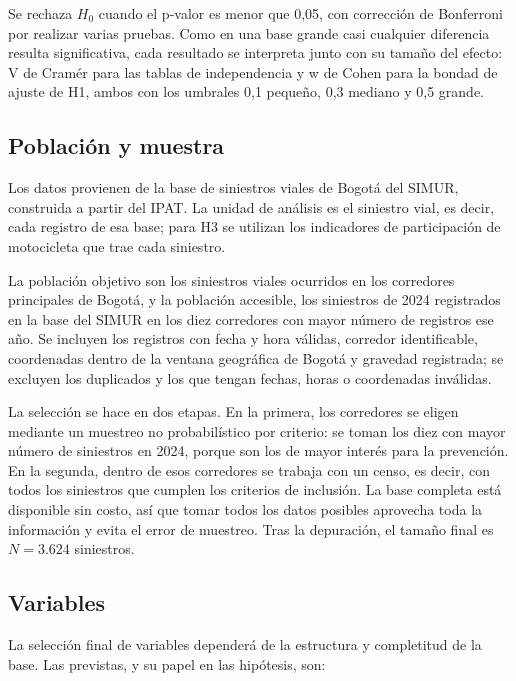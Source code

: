 \documentclass[12pt,letterpaper]{article}
\begin{document}
Se rechaza $H_0$ cuando el p-valor es menor que 0,05, con corrección de
Bonferroni por realizar varias pruebas. Como en una base grande casi
cualquier diferencia resulta significativa, cada resultado se interpreta
junto con su tamaño del efecto: V de Cramér para las tablas de
independencia y w de Cohen para la bondad de ajuste de H1, ambos con
los umbrales 0,1 pequeño, 0,3 mediano y 0,5 grande.

\hypertarget{poblaciuxf3n-y-muestra}{%
\subsection{Población y muestra}\label{poblaciuxf3n-y-muestra}}

Los datos provienen de la base de siniestros viales de Bogotá del SIMUR,
construida a partir del IPAT. La unidad de análisis es el siniestro
vial, es decir, cada registro de esa base; para H3 se utilizan los
indicadores de participación de motocicleta que trae cada siniestro.

La población objetivo son los siniestros viales ocurridos en los
corredores principales de Bogotá, y la población accesible, los
siniestros de 2024 registrados en la base del SIMUR en los diez
corredores con mayor número de registros ese año. Se incluyen los
registros con fecha y hora válidas, corredor identificable, coordenadas
dentro de la ventana geográfica de Bogotá y gravedad registrada; se excluyen los duplicados y los
que tengan fechas, horas o coordenadas inválidas.

La selección se hace en dos etapas. En la primera, los corredores se
eligen mediante un muestreo no probabilístico por criterio: se toman los
diez con mayor número de siniestros en 2024, porque son los de mayor
interés para la prevención. En la segunda, dentro de esos corredores se
trabaja con un censo, es decir, con todos los siniestros que cumplen los
criterios de inclusión. La base completa está disponible sin costo, así
que tomar todos los datos posibles aprovecha toda la información y evita
el error de muestreo. Tras la depuración, el tamaño final es
$N=3.624$ siniestros.

\hypertarget{variables}{%
\subsection{Variables}\label{variables}}

La selección final de variables dependerá de la estructura y
completitud de la base. Las previstas, y su papel en las hipótesis, son:
\end{document}
